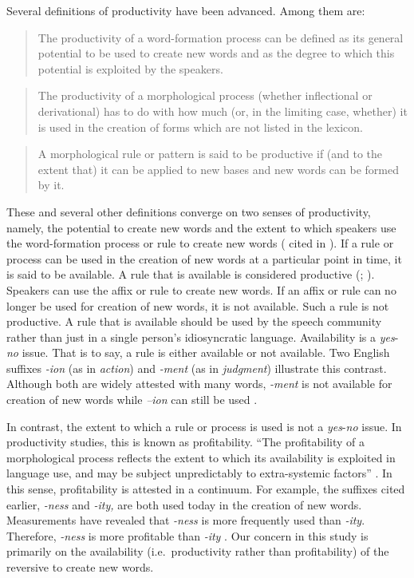 \documentclass[output=paper]{langsci/langscibook}
\begin{document}
Several definitions of productivity have been advanced. Among them are: 

\begin{quote}
The productivity of a word-formation process can be defined as its general potential to be used to create new words and as the degree to which this potential is exploited by the speakers. \citep[127]{Plag2006}
\end{quote}

\begin{quote}
The productivity of a morphological process (whether inflectional or derivational) has to do with how much (or, in the limiting case, whether) it is used in the creation of forms which are not listed in the lexicon. \citep[315]{Bauer2005}
\end{quote}

\begin{quote}
A morphological rule or pattern is said to be productive if (and to the extent that) it can be applied to new bases and new words can be formed by it. \citep[114]{HaspelmathSims2010}
\end{quote}

These and several other definitions converge on two senses of productivity, namely, the potential to create new words and the extent to which speakers use the word-formation process or rule to create new words (\citealt{Corbin1987} cited in \citealt{Bauer2001}). If a rule or process can be used in the creation of new words at a particular point in time, it is said to be available. A rule that is available is considered productive (\citealt[205]{Bauer2001}; \citealt{Plag2006}). Speakers can use the affix or rule to create new words. If an affix or rule can no longer be used for creation of new words, it is not available. Such a rule is not productive. A rule that is available should be used by the speech community rather than just in a single person’s idiosyncratic language. Availability is a \textit{yes}-\textit{no} issue. That is to say, a rule is either available or not available. Two English suffixes \textit{-ion} (as in \textit{action}) and \textit{-ment} (as in \textit{judgment}) illustrate this contrast. Although both are widely attested with many words, \textit{-ment} is not available for creation of new words while \textit{–ion} can still be used \citep{Bauer2001}. 

In contrast, the extent to which a rule or process is used is not a \textit{yes}-\textit{no} issue. In productivity studies, this is known as profitability. “The profitability of a morphological process reflects the extent to which its availability is exploited in language use, and may be subject unpredictably to extra-systemic factors” \citep[211]{Bauer2001}. In this sense, profitability is attested in a continuum. For example, the suffixes cited earlier, \textit{-ness} and \textit{-ity,} are both used today in the creation of new words. Measurements have revealed that \textit{-ness} is more frequently used than \textit{-ity}. Therefore, \textit{-ness} is more profitable than \textit{-ity} \citep{Plag2006}. Our concern in this study is primarily on the availability (i.e.\ productivity rather than profitability) of the reversive to create new words. 
\end{document}

